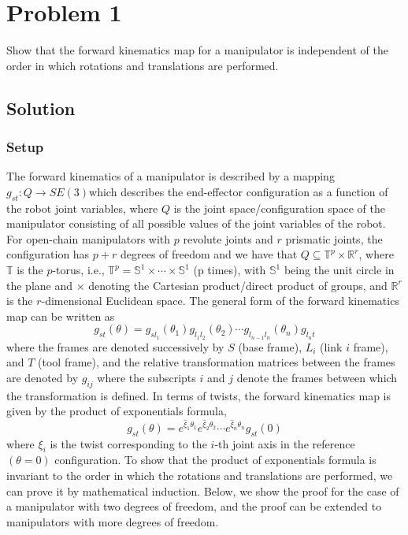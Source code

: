 \section*{Problem 1}
\setcounter{section}{1}
\setcounter{equation}{0}

Show that the forward kinematics map for a manipulator is independent of the order in which rotations and translations are performed.

\subsection*{Solution}

\subsubsection*{Setup}

The forward kinematics of a manipulator is described by a mapping \( g_{st} : Q \to SE (3) \)which describes the end-eﬀector configuration as a function of the robot joint variables, where \( Q \) is the joint space/configuration space of the manipulator consisting of all possible values of the joint variables of the robot.
For open-chain manipulators with \( p \) revolute joints and \( r \) prismatic joints, the configuration has \( p+r \) degrees of freedom and we have that \( Q \subseteq \mathbb{T}^{p} \times \mathbb{R}^{r} \), where \( \mathbb{T} \) is the \(p\)-torus, i.e., \( \mathbb{T}^{p} = \mathbb{S}^{1} \times \cdots \times \mathbb{S}^{1} \) (p times), with \( \mathbb{S}^{1} \) being the unit circle in the plane and \( \times \) denoting the Cartesian product/direct product of groups, and \( \mathbb{R}^{r} \) is the \(r\)-dimensional Euclidean space.
The general form of the forward kinematics map can be written as
\begin{equation}
    g_{st}(\theta)
    =
    g_{s l_1}(\theta_1)
    g_{l_1 l_2}(\theta_2)
    \cdots
    g_{l_{n-1} l_n}(\theta_n)
    g_{l_n t}
\end{equation}
where the frames are denoted successively by \( S \) (base frame), \( L_i \) (link \(i\) frame), and \( T \) (tool frame), and the relative transformation matrices between the frames are denoted by \( g_{ij} \) where the subscripts \( i \) and \( j \) denote the frames between which the transformation is defined.
In terms of twists, the forward kinematics map is given by the product of exponentials formula,
\begin{equation}
    g_{st}(\theta)
    =
    e^{\widehat{\xi}_1 \theta_1}
    e^{\widehat{\xi}_2 \theta_2}
    \cdots
    e^{\widehat{\xi}_n \theta_n}
    g_{st}(0)
\end{equation}
where \( \xi_{i} \) is the twist corresponding to the \(i\)-th joint axis in the reference \( (\theta = 0) \) conﬁguration.
To show that the product of exponentials formula is invariant to the order in which the rotations and translations are performed, we can prove it by mathematical induction.
Below, we show the proof for the case of a manipulator with two degrees of freedom, and the proof can be extended to manipulators with more degrees of freedom.

